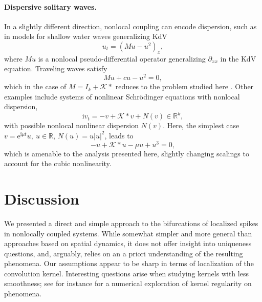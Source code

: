 \documentclass[10pt]{article}
\newcommand{\R}{\mathbb{R}}
\newcommand{\rme}{\mathrm{e}}
\newcommand{\rmi}{\mathrm{i}}
\newcommand{\K}{\mathcal{K}}
\begin{document}
\paragraph{Dispersive solitary waves.}
In a slightly different direction, nonlocal coupling can encode dispersion, such as in models for shallow water waves generalizing KdV
\[
u_t=(Mu-u^2)_x,
\]
where $Mu$ is a nonlocal pseudo-differential operator generalizing $\partial_{xx}$ in the KdV equation. Traveling waves satisfy 
\[
Mu+cu-u^2=0,
\]
which in the case of $M=I_k+\K*$ reduces to the problem studied here \cite{waterwave}. Other examples include systems of nonlinear Schr\"odinger equations with nonlocal dispersion, 
\[
\rmi v_t=-v+\K*v + N(v)\in\R^k,
\]
with possible nonlocal nonlinear dispersion $N(v)$. Here, the simplest case $v=\rme^{\rmi\mu t}u,\ u\in\R$, $N(u)=u|u|^2$, leads to 
\[
-u+\K*u-\mu u + u^3=0,
\]
which is amenable to the analysis presented here, slightly changing scalings to account for the cubic nonlinearity. 


% 
% 
% 
% 

\section{Discussion}\label{s:d}

We presented a direct and simple approach to the bifurcations of localized spikes in nonlocally coupled systems. While somewhat simpler and more general than approaches based on spatial dynamics, it does not offer insight into uniqueness questions, and, arguably, relies on an a priori understanding of the resulting phenomena. Our assumptions appear to be sharp in terms of localization of the convolution kernel. Interesting questions arise when studying kernels with less smoothness; see for instance \cite{pin} for a numerical exploration of kernel regularity on phenomena. 
\end{document}
